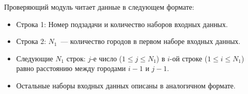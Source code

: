 Проверяющий модуль читает данные в следующем формате:
\begin{itemize}
\item Строка 1: Номер подзадачи и количество наборов входных данных.
\item Строка 2: $N_1$~--- количество городов в первом наборе входных данных.
\item Следующие $N_1$ строк: $j$-е число ($1 \le j \le N_1$) в $i$-ой строке ($1 \le i \le N_1$) равно
расстоянию между городами $i - 1$ и $j - 1$.
\item Остальные наборы входных данных описаны в аналогичном формате.
\end{itemize}
